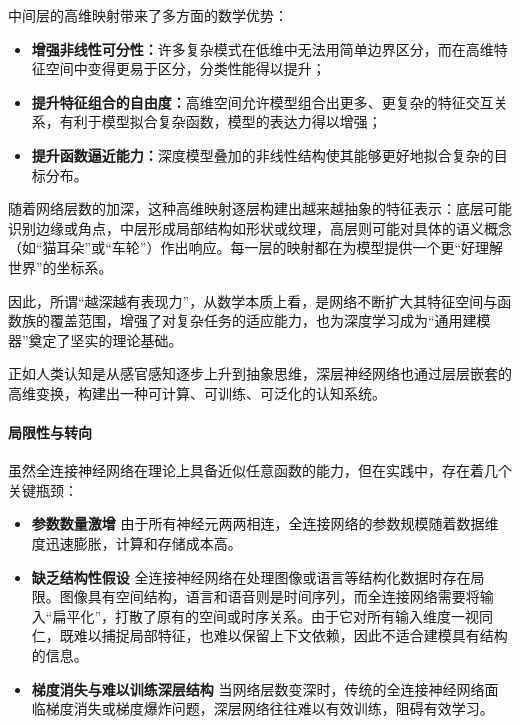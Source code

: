 中间层的高维映射带来了多方面的数学优势：
\begin{itemize}
\item {\bf  增强非线性可分性：}许多复杂模式在低维中无法用简单边界区分，而在高维特征空间中变得更易于区分，分类性能得以提升；

\item {\bf  提升特征组合的自由度：}高维空间允许模型组合出更多、更复杂的特征交互关系，有利于模型拟合复杂函数，模型的表达力得以增强；

\item {\bf  提升函数逼近能力：}深度模型叠加的非线性结构使其能够更好地拟合复杂的目标分布。

\end{itemize}

随着网络层数的加深，这种高维映射逐层构建出越来越抽象的特征表示：底层可能识别边缘或角点，中层形成局部结构如形状或纹理，高层则可能对具体的语义概念（如“猫耳朵”或“车轮”）作出响应。每一层的映射都在为模型提供一个更“好理解世界”的坐标系。

因此，所谓“越深越有表现力”，从数学本质上看，是网络不断扩大其特征空间与函数族的覆盖范围，增强了对复杂任务的适应能力，也为深度学习成为“通用建模器”奠定了坚实的理论基础。

正如人类认知是从感官感知逐步上升到抽象思维，深层神经网络也通过层层嵌套的高维变换，构建出一种可计算、可训练、可泛化的认知系统。


\paragraph*{局限性与转向}

虽然全连接神经网络在理论上具备近似任意函数的能力，但在实践中，存在着几个关键瓶颈：
\begin{itemize}
\item {\bf  参数数量激增}
  由于所有神经元两两相连，全连接网络的参数规模随着数据维度迅速膨胀，计算和存储成本高。

\item {\bf  缺乏结构性假设} 
全连接神经网络在处理图像或语言等结构化数据时存在局限。图像具有空间结构，语言和语音则是时间序列，而全连接网络需要将输入“扁平化”，打散了原有的空间或时序关系。由于它对所有输入维度一视同仁，既难以捕捉局部特征，也难以保留上下文依赖，因此不适合建模具有结构的信息。

\item {\bf  梯度消失与难以训练深层结构}
  当网络层数变深时，传统的全连接神经网络面临梯度消失或梯度爆炸问题，深层网络往往难以有效训练，阻碍有效学习。
\end{itemize}

